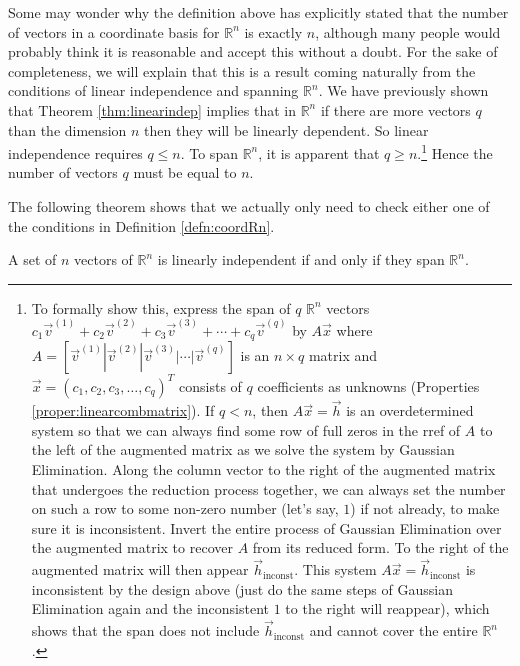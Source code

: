 Some may wonder why the definition above has explicitly stated that the number of vectors in a coordinate basis for $\mathbb{R}^n$ is exactly $n$, although many people would probably think it is reasonable and accept this without a doubt. For the sake of completeness, we will explain that this is a result coming naturally from the conditions of linear independence and spanning $\mathbb{R}^n$. We have previously shown that Theorem \ref{thm:linearindep} implies that in $\mathbb{R}^n$ if there are more vectors $q$ than the dimension $n$ then they will be linearly dependent. So linear independence requires $q \leq n$. To span $\mathbb{R}^n$, it is apparent that $q \geq n$.\footnote{
\label{foot:inconsth}
To formally show this, express the span of $q$ $\mathbb{R}^n$ vectors $c_1\vec{v}^{(1)} + c_2\vec{v}^{(2)} + c_3\vec{v}^{(3)} + \cdots + c_q\vec{v}^{(q)}$ by $A\vec{x}$ where $A = [\vec{v}^{(1)}|\vec{v}^{(2)}|\vec{v}^{(3)}|\cdots|\vec{v}^{(q)}]$ is an $n \times q$ matrix and $\vec{x} = (c_1, c_2, c_3, \ldots, c_q)^T$ consists of $q$ coefficients as unknowns (Properties \ref{proper:linearcombmatrix}). If $q < n$, then $A\vec{x} = \vec{h}$ is an overdetermined system so that we can always find some row of full zeros in the rref of $A$ to the left of the augmented matrix as we solve the system by Gaussian Elimination. Along the column vector to the right of the augmented matrix that undergoes the reduction process together, we can always set the number on such a row to some non-zero number (let's say, $1$) if not already, to make sure it is inconsistent. Invert the entire process of Gaussian Elimination over the augmented matrix to recover $A$ from its reduced form. To the right of the augmented matrix will then appear $\vec{h}_{\text{inconst}}$. This system $A\vec{x} = \vec{h}_{\text{inconst}}$ is inconsistent by the design above (just do the same steps of Gaussian Elimination again and the inconsistent $1$ to the right will reappear), which shows that the span does not include $\vec{h}_{\text{inconst}}$ and cannot cover the entire $\mathbb{R}^n$.} Hence the number of vectors $q$ must be equal to $n$. \par
The following theorem shows that we actually only need to check either one of the conditions in Definition \ref{defn:coordRn}.
\begin{thm}
\label{thm:linindspan}
A set of $n$ vectors of $\mathbb{R}^n$ is linearly independent if and only if they span $\mathbb{R}^n$.
\end{thm}
